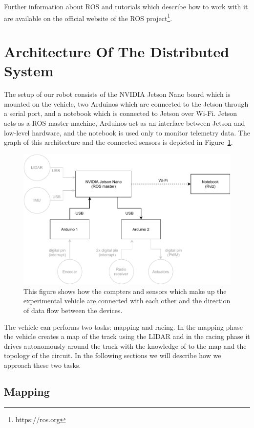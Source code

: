 Further information about ROS and tutorials which describe how to work with it are available on the official website of the ROS project\footnote{https://ros.org}.
%
\section{Architecture Of The Distributed System}

The setup of our robot consists of the NVIDIA Jetson Nano board which is mounted on the vehicle, two Arduinos which are connected to the Jetson through a serial port, and a notebook which is connected to Jetson over Wi-Fi. Jetson acts as a ROS master machine, Arduinos act as an interface between Jetson and low-level hardware, and the notebook is used only to monitor telemetry data. The graph of this architecture and the connected sensors is depicted in Figure~\ref{fig:ros_diagram}.

\begin{figure}[]\centering
\includegraphics[width=125mm]{../img/ros_diagram.pdf}
\caption{This figure shows how the compters and sensors which make up the experimental vehicle are connected with each other and the direction of data flow between the devices.}
\label{fig:ros_diagram}
\end{figure}

The vehicle can performs two tasks: mapping and racing. In the mapping phase the vehicle creates a map of the track using the LIDAR and in the racing phase it drives autonomously around the track with the knowledge of to the map and the topology of the circuit. In the following sections we will describe how we approach these two tasks.

\subsection{Mapping}

